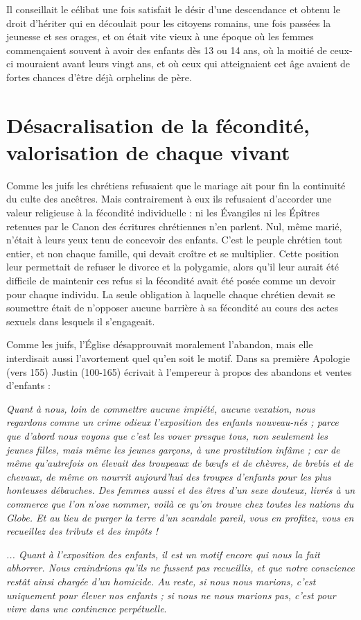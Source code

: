 Il conseillait le célibat une fois satisfait le désir d'une descendance et obtenu le droit d'hériter qui en découlait pour les citoyens romains, une fois passées la jeunesse et ses orages, et on était vite vieux à une époque où les femmes commençaient souvent à avoir des enfants dès 13 ou 14 ans, où la moitié de ceux-ci mouraient avant leurs vingt ans, et où ceux qui atteignaient cet âge avaient de fortes chances d'être déjà orphelins de père. 


\section{Désacralisation de la fécondité, valorisation de chaque vivant}

 Comme les juifs les chrétiens refusaient que le mariage ait pour fin la continuité du culte des ancêtres. Mais contrairement à eux ils refusaient d'accorder une valeur religieuse à la fécondité individuelle : ni les Évangiles ni les Épîtres retenues par le Canon des écritures chrétiennes n'en parlent. Nul, même marié, n'était à leurs yeux tenu de concevoir des enfants. C'est le peuple chrétien tout entier, et non chaque famille, qui devait croître et se multiplier. Cette position leur permettait de refuser le divorce et la polygamie, alors qu'il leur aurait été difficile de maintenir ces refus si la fécondité avait été posée comme un devoir pour chaque individu. La seule obligation à laquelle chaque chrétien devait se soumettre était de n'opposer aucune barrière à sa fécondité au cours des actes sexuels dans lesquels il s'engageait. 

 Comme les juifs, l'Église désapprouvait moralement l'abandon, mais elle interdisait aussi l'avortement quel qu'en soit le motif. Dans sa première Apologie (vers 155) Justin (100-165) écrivait à l'empereur à propos des abandons et ventes d'enfants :

\begin{displayquote}
\emph{Quant à nous, loin de commettre aucune impiété, aucune vexation, nous regardons comme un crime odieux l'exposition des enfants nouveau-nés ; parce que d'abord nous voyons que c'est les vouer presque tous, non seulement les jeunes filles, mais même les jeunes garçons, à une prostitution infâme ; car de même qu'autrefois on élevait des troupeaux de bœufs et de chèvres, de brebis et de chevaux, de même on nourrit aujourd'hui des troupes d'enfants pour les plus honteuses débauches. Des femmes aussi et des êtres d'un sexe douteux, livrés à un commerce que l'on n'ose nommer, voilà ce qu'on trouve chez toutes les nations du Globe. Et au lieu de purger la terre d'un scandale pareil, vous en profitez, vous en recueillez des tributs et des impôts !}

 \emph{... Quant à l'exposition des enfants, il est un motif encore qui nous la fait abhorrer. Nous craindrions qu'ils ne fussent pas recueillis, et que notre conscience restât ainsi chargée d'un homicide. Au reste, si nous nous marions, c'est uniquement pour élever nos enfants ; si nous ne nous marions pas, c'est pour vivre dans une continence perpétuelle}.
\end{displayquote}

